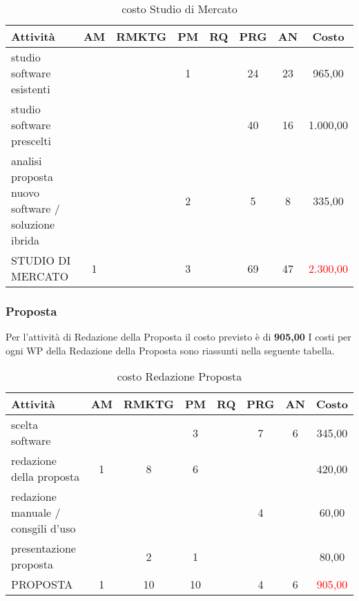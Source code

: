 \begin{table}[!h]
\centering
\begin{tabular}{|l|c|c|c|c|c|c|c|}
\hline
\textbf{Attività}& \textbf{AM} & \textbf{RMKTG} & \textbf{PM} & \textbf{RQ} & \textbf{PRG} & \textbf{AN} & \textbf{Costo}  \\ 
              
\hline
studio software esistenti & & & 1& & 24& 23& \text{\euro} 965,00\\
studio software prescelti	 				  & & &	&	&40 &16 & \text{\euro} 1.000,00 \\	
 \parbox{162 px}{analisi proposta nuovo software / soluzione ibrida} 					  & & &2 & 	&5	&  8  &  	\text{\euro} 335,00 \\			  
\hline
STUDIO DI MERCATO  							& 1 &  &3 & &69	&47	&	\textcolor{red}{ \text{\euro}2.300,00 }\\		 
\hline
\end{tabular}
\caption{costo Studio di Mercato}\label{tab:mercato}
\end{table}







\subsubsection{Proposta}
Per l'attività di Redazione della Proposta il costo previsto è di \textbf	{ \text{\euro} 905,00 }	
I costi per ogni WP della Redazione della Proposta sono riassunti nella seguente tabella.


\begin{table}[!h]
\centering
\begin{tabular}{|l|c|c|c|c|c|c|c|}
\hline
\textbf{Attività}& \textbf{AM} & \textbf{RMKTG} & \textbf{PM} & \textbf{RQ} & \textbf{PRG} & \textbf{AN} & \textbf{Costo}  \\ 
              
\hline

scelta software			& & & 3&	& 7&	6& 	\text{\euro} 345,00 \\
redazione della proposta & 1&	8&	6& & & & 	 \text{\euro} 420,00 \\
redazione manuale / consgili d'uso & & & & & 					4 && 	\text{\euro} 60,00 \\	
presentazione proposta		 & & 2&  	1	& & 	& & 		 \text{\euro} 80,00 \\	

	  
\hline
PROPOSTA  							& 1  &10 &10& &	4&	6&	\textcolor{red}{ \text{\euro} 905,00 }\\		 
\hline
\end{tabular}
\caption{costo Redazione Proposta}\label{tab:proposta}
\end{table}	
	
